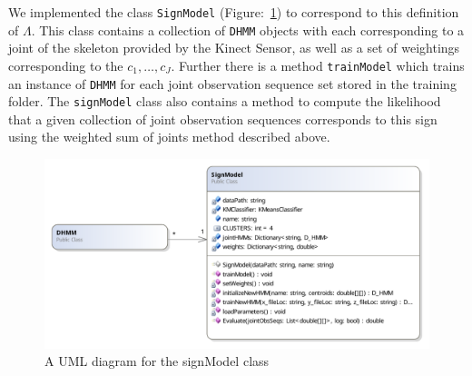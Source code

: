We implemented the class \verb|SignModel| (Figure:~\ref{fig:signModel}) to correspond to this definition of $\Lambda$. This class contains a collection of \verb|DHMM| objects with each corresponding to a joint of the skeleton provided by the Kinect Sensor, as well as a set of weightings corresponding to the $c_1, \dots , c_J$. Further there is a method \verb|trainModel| which trains an instance of \verb|DHMM| for each joint observation sequence set stored in the training folder. The \verb|signModel| class also contains a method to compute the likelihood that a given collection of joint observation sequences corresponds to this sign using the weighted sum of joints method described above.
\begin{figure}
        \centering
        \includegraphics[width=1.03\textwidth]{ThesisFigs/signModelDiag}
        \caption{A UML diagram for the signModel class}\label{fig:signModel}
\end{figure}


